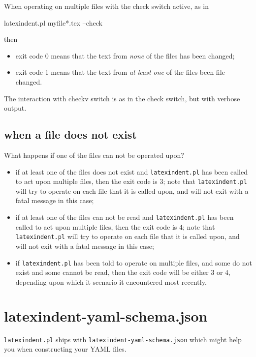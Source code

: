 		When operating on multiple files with the check switch active, as in
		\begin{commandshell}
latexindent.pl myfile*.tex --check
        \end{commandshell}
		then
		\begin{itemize}
			\item exit code 0 means that the text from \emph{none} of the files has been changed;
			\item exit code 1 means that the text from \emph{at least one} of the files been file changed.
		\end{itemize}

		The interaction with checkv switch is as in the check switch, but with verbose output.

	\subsection{when a file does not exist}
    What happens if one of the files can not be operated upon? 
    \begin{itemize}
      \item if at least one of the files does not exist and \texttt{latexindent.pl} has been called to 
          act upon multiple files, then the exit code is 3; note that \texttt{latexindent.pl} will 
          try to operate on each file that it is called upon, and will not exit with a fatal message
          in this case;
        \item if at least one of the files can not be read and \texttt{latexindent.pl} has been called to 
          act upon multiple files, then the exit code is 4; note that \texttt{latexindent.pl} will 
          try to operate on each file that it is called upon, and will not exit with a fatal message
          in this case;
        \item if \texttt{latexindent.pl} has been told to operate on multiple files, and some do not 
          exist and some cannot be read, then the exit code will be either 3 or 4, depending
          upon which it scenario it encountered most recently.
        \end{itemize}

	\section{latexindent-yaml-schema.json}

	 \texttt{latexindent.pl}
	  ships with
	 \texttt{latexindent-yaml-schema.json}
	 which might help you when constructing your YAML files.

